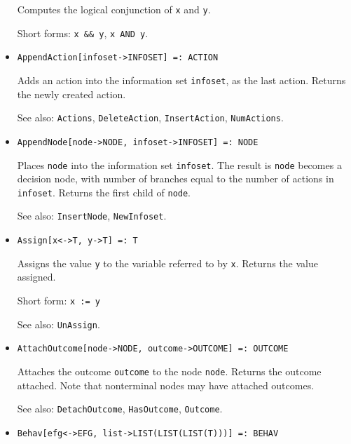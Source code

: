 \begin{itemize}
\bd
Computes the logical conjunction of \verb+x+ and \verb+y+.
\item
[Short forms:] \verb+x && y+, \verb+x AND y+.
\ed


\item
\protect \large \begin{verbatim}
AppendAction[infoset->INFOSET] =: ACTION
\end{verbatim}\normalsize

\bd
Adds an action into the information set \verb+infoset+,
as the last action.  Returns the newly created action.
\item
[See also:] {\tt Actions}, {\tt DeleteAction}, {\tt InsertAction},
{\tt NumActions}.
\ed


\item
\protect \large \begin{verbatim} 
AppendNode[node->NODE, infoset->INFOSET] =: NODE
\end{verbatim}\normalsize

\bd
Places \verb+node+ into the information set
\verb+infoset+.  The result is \verb+node+ becomes a decision node,
with number of branches equal to the number of actions in \verb+infoset+.
Returns the first child of \verb+node+.
\item
[See also:] {\tt InsertNode}, {\tt NewInfoset}.
\ed

\item 
\protect \large \begin{verbatim}
Assign[x<->T, y->T] =: T
\end{verbatim} \normalsize

\bd
Assigns the value \verb+y+ to the variable referred to by
\verb+x+.  Returns the value assigned.
\item
[Short form:] \verb+x := y+
\item
[See also:] {\tt UnAssign}.
\ed

\item
\protect \large \begin{verbatim} 
AttachOutcome[node->NODE, outcome->OUTCOME] =: OUTCOME
\end{verbatim}\normalsize

\bd
Attaches the outcome \verb+outcome+ to the node \verb+node+.
Returns the outcome attached.  Note that nonterminal nodes may have
attached outcomes.
\item
[See also:] {\tt DetachOutcome}, {\tt HasOutcome}, {\tt Outcome}.
\ed



\item
\protect \large \begin{verbatim}
Behav[efg<->EFG, list->LIST(LIST(LIST(T)))] =: BEHAV
\end{verbatim}\normalsize


\end{itemize}
